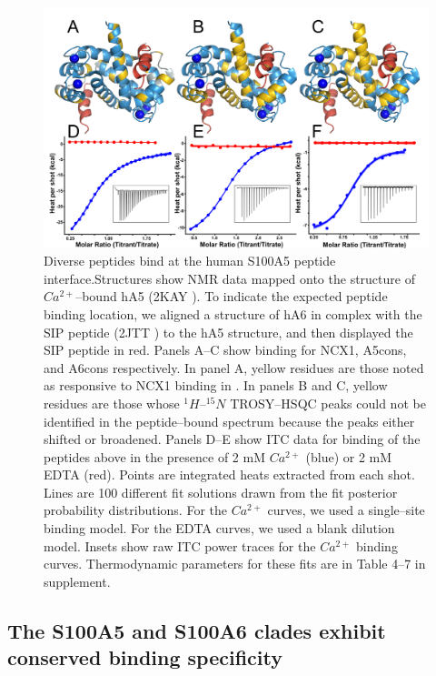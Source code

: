 \begin{figure}
\centering
	\includegraphics{ch5-fig2.png} 
\caption[Diverse peptides bind at the human S100A5 peptide interface]{Diverse peptides bind at the human S100A5 peptide interface.Structures show NMR data mapped onto the structure of $Ca^{2+}$--bound
hA5 (2KAY \citep{bertini_solution_2009}). To indicate the expected
peptide binding location, we aligned a structure of hA6 in complex
with the SIP peptide (2JTT \citep{lee_structure_2008}) to the hA5
structure, and then displayed the SIP peptide in red. Panels A--C show
binding for NCX1, A5cons, and A6cons respectively. In panel A, yellow
residues are those noted as responsive to NCX1 binding in \citep{liriano_structure_2012}.
In panels B and C, yellow residues are those whose $^{1}H$--$^{15}N$
TROSY--HSQC peaks could not be identified in the peptide--bound spectrum
because the peaks either shifted or broadened. Panels D--E show ITC
data for binding of the peptides above in the presence of 2 mM $Ca^{2+}$
(blue) or 2 mM EDTA (red). Points are integrated heats extracted from
each shot. Lines are 100 different fit solutions drawn from the fit
posterior probability distributions. For the $Ca^{2+}$ curves,
we used a single--site binding model. For the EDTA curves, we used
a blank dilution model. Insets show raw ITC power traces for the $Ca^{2+}$
binding curves. Thermodynamic parameters for these fits are in Table
4--7 in supplement.\label{samplefigure}}	
\end{figure}

\subsection{The S100A5 and S100A6 clades exhibit conserved binding specificity}

